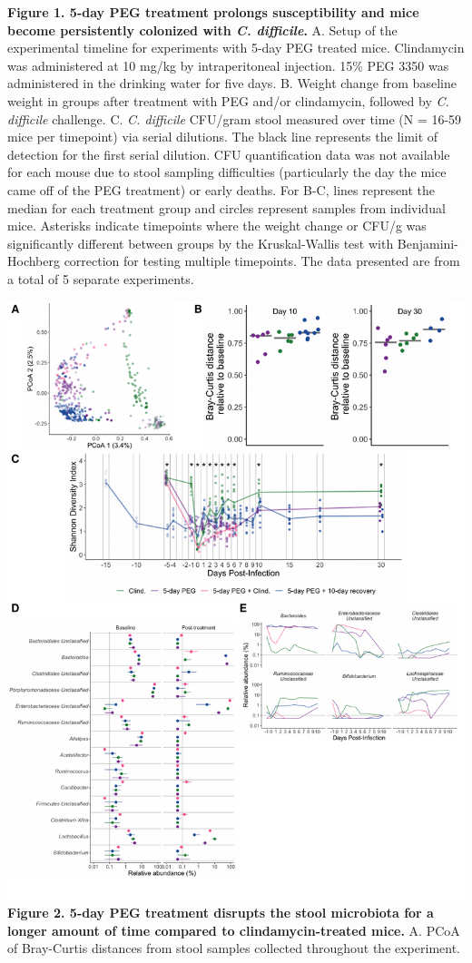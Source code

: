 \documentclass[
  11pt,
]{article}
\begin{document}
\textbf{Figure 1. 5-day PEG treatment prolongs susceptibility and mice
become persistently colonized with \emph{C. difficile}.} A. Setup of the
experimental timeline for experiments with 5-day PEG treated mice.
Clindamycin was administered at 10 mg/kg by intraperitoneal injection.
15\% PEG 3350 was administered in the drinking water for five days. B.
Weight change from baseline weight in groups after treatment with PEG
and/or clindamycin, followed by \emph{C. difficile} challenge. C.
\emph{C. difficile} CFU/gram stool measured over time (N = 16-59 mice
per timepoint) via serial dilutions. The black line represents the limit
of detection for the first serial dilution. CFU quantification data was
not available for each mouse due to stool sampling difficulties
(particularly the day the mice came off of the PEG treatment) or early
deaths. For B-C, lines represent the median for each treatment group and
circles represent samples from individual mice. Asterisks indicate
timepoints where the weight change or CFU/g was significantly different
between groups by the Kruskal-Wallis test with Benjamini-Hochberg
correction for testing multiple timepoints. The data presented are from
a total of 5 separate experiments. \newpage

\includegraphics{figure_2.pdf} \textbf{Figure 2. 5-day PEG treatment
disrupts the stool microbiota for a longer amount of time compared to
clindamycin-treated mice.} A. PCoA of Bray-Curtis distances from stool
samples collected throughout the experiment. \newpage
\end{document}
